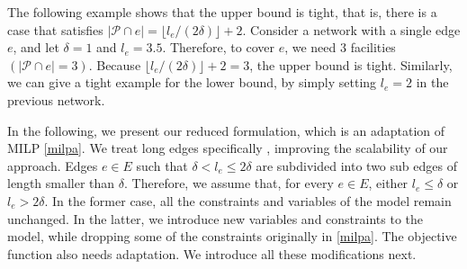  \begin{remark}
The following example shows that the upper bound is tight, that is, there is a case that satisfies $|\mathcal{P} \cap e| =  \lfloor l_e/(2\delta)  \rfloor +2$. Consider a network with a single edge $e$, and  let $\delta = 1 $ and $l_e = 3.5$. Therefore, to cover $e$, we need 3 facilities $(|\mathcal{P} \cap e |=3)$. Because $\lfloor l_e/(2\delta)  \rfloor +2 = 3$, the upper bound is tight. Similarly, we can give a tight example for the lower bound, by simply setting $l_e= 2$ in the previous  network.
\end{remark}


In the following, we present our reduced formulation, which is an adaptation of MILP \eqref{milpa}. We treat long edges specifically%
, improving the scalability of our approach. Edges $e\in E$ such that $\delta < l_e \leq 2\delta$ are subdivided  into two sub edges of length smaller than $\delta$. Therefore, we assume that, for every $e\in E$, either $l_e\leq \delta$ or $l_e> 2\delta$. In the former case, all the constraints and variables of the model remain unchanged. In the latter, we introduce new variables and constraints to the model, while dropping some of the constraints originally in \eqref{milpa}. The objective function also needs adaptation. We introduce all these modifications next.

